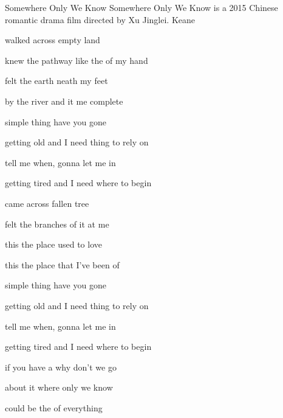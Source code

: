 \begin{SBSong}{Somewhere Only We Know}
  {Somewhere Only We Know is a 2015 Chinese romantic drama film directed by Xu Jinglei.}
  {Keane}
  \begin{SBVerse}
     walked across  empty land
    
     knew the pathway like the  of my hand
    
     felt the earth neath my feet
    
     by the river and it  me complete
  \end{SBVerse}
  \begin{SBVerse}
     simple thing  have you gone
    
     getting old and I need thing to rely on
    
     tell me when,  gonna let me in
    
     getting tired and I need where to begin
  \end{SBVerse}
  \begin{SBVerse}
     came across  fallen tree
    
     felt the branches of it  at me
    
     this the place  used to love
    
     this the place that I've been  of
  \end{SBVerse}
  \begin{SBVerse}
     simple thing  have you gone
    
     getting old and I need thing to rely on
    
     tell me when,  gonna let me in
    
     getting tired and I need where to begin
  \end{SBVerse}
  \CBPageBrk
  \begin{SBVerse}
     if you have a  why don't we go
    
     about it where only we know
    
     could be the  of everything
    

\end{SBVerse}
\end{SBSong}
